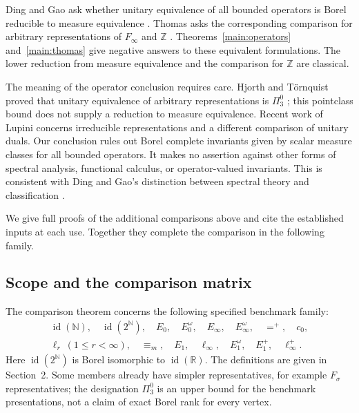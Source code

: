 \documentclass[11pt]{article}
\numberwithin{equation}{section}
\theoremstyle{definition}
\newcommand{\N}{\mathbb N}
\newcommand{\R}{\mathbb R}
\newcommand{\Z}{\mathbb Z}
\newcommand{\meq}{\equiv_m}
\newcommand{\id}{\operatorname{id}}
\begin{document}
Ding and Gao ask whether unitary equivalence of all bounded operators
is Borel reducible to measure equivalence \cite[p.~735]{DingGao}.
Thomas asks the corresponding comparison for arbitrary representations
of $F_\infty$ and $\Z$ \cite[Question~8.2, p.~1784]{Thomas}.
Theorems~\ref{main:operators} and~\ref{main:thomas} give negative
answers to these equivalent formulations. The lower reduction from
measure equivalence and the comparison for $\Z$ are classical.

The meaning of the operator conclusion requires care. Hjorth and
T\"ornquist proved that unitary equivalence of arbitrary representations
is $\Pi^0_3$ \cite{HT12}; this pointclass bound does not supply a
reduction to measure equivalence. Recent work of Lupini
\cite[Theorems~F and~G]{Lupini26} concerns irreducible representations
and a different comparison of unitary duals. Our conclusion rules
out Borel complete invariants given by scalar measure classes for
all bounded operators. It makes no assertion against other forms of
spectral analysis, functional calculus, or operator-valued invariants.
This is consistent with Ding and Gao's distinction between spectral
theory and classification \cite[p.~731]{DingGao}.

We give full proofs of the additional comparisons above and cite the
established inputs at each use. Together they complete the comparison
in the following family.

\subsection{Scope and the comparison matrix}
The comparison theorem concerns the following specified benchmark family:
\[
\begin{gathered}
\id(\N),\quad \id(2^\N),\quad E_0,\quad E_0^\omega,\quad
E_\infty,\quad E_\infty^\omega,\quad =^+,\quad c_0,\\
\ell_r\ (1\le r<\infty),\quad \meq,\quad E_1,\quad
\ell_\infty,\quad E_1^\omega,\quad E_1^+,\quad \ell_\infty^+ .
\end{gathered}
\]
Here $\id(2^\N)$ is Borel isomorphic to $\id(\R)$.
The definitions are given in Section~2. Some members already have
simpler representatives, for example $F_\sigma$ representatives; the
designation $\Pi^0_3$ is an upper bound for the benchmark presentations,
not a claim of exact Borel rank for every vertex.
\end{document}
